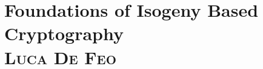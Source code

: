 

\chapter[toc=Foundations of Isogeny Based Cryptography\\{\protect\small\emph{Luca De Feo}}, headings=Foundations of Isogeny Based Cryptography]{Foundations of Isogeny Based Cryptography\\\vspace{2mm}\normalsize \textsc{Luca De Feo}\protect}


